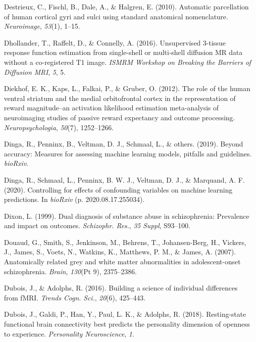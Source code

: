 \documentclass[11pt,american,a4paper,oneside,]{memoir} %
\begin{document}
\leavevmode\hypertarget{ref-Destrieux2010-rd}{}%
Destrieux, C., Fischl, B., Dale, A., \& Halgren, E. (2010). Automatic parcellation of human cortical gyri and sulci using standard anatomical nomenclature. \emph{Neuroimage}, \emph{53}(1), 1--15.

\leavevmode\hypertarget{ref-Dhollander2016-dx}{}%
Dhollander, T., Raffelt, D., \& Connelly, A. (2016). Unsupervised 3-tissue response function estimation from single-shell or multi-shell diffusion MR data without a co-registered T1 image. \emph{ISMRM Workshop on Breaking the Barriers of Diffusion MRI}, \emph{5}, 5.

\leavevmode\hypertarget{ref-diekhof2012role}{}%
Diekhof, E. K., Kaps, L., Falkai, P., \& Gruber, O. (2012). The role of the human ventral striatum and the medial orbitofrontal cortex in the representation of reward magnitude--an activation likelihood estimation meta-analysis of neuroimaging studies of passive reward expectancy and outcome processing. \emph{Neuropsychologia}, \emph{50}(7), 1252--1266.

\leavevmode\hypertarget{ref-Dinga2019-mh}{}%
Dinga, R., Penninx, B., Veltman, D. J., Schmaal, L., \& others. (2019). Beyond accuracy: Measures for assessing machine learning models, pitfalls and guidelines. \emph{bioRxiv}.

\leavevmode\hypertarget{ref-Dinga2020-si}{}%
Dinga, R., Schmaal, L., Penninx, B. W. J., Veltman, D. J., \& Marquand, A. F. (2020). Controlling for effects of confounding variables on machine learning predictions. In \emph{bioRxiv} (p. 2020.08.17.255034).

\leavevmode\hypertarget{ref-Dixon1999-kl}{}%
Dixon, L. (1999). Dual diagnosis of substance abuse in schizophrenia: Prevalence and impact on outcomes. \emph{Schizophr. Res.}, \emph{35 Suppl}, S93--100.

\leavevmode\hypertarget{ref-Douaud2007-sw}{}%
Douaud, G., Smith, S., Jenkinson, M., Behrens, T., Johansen-Berg, H., Vickers, J., James, S., Voets, N., Watkins, K., Matthews, P. M., \& James, A. (2007). Anatomically related grey and white matter abnormalities in adolescent-onset schizophrenia. \emph{Brain}, \emph{130}(Pt 9), 2375--2386.

\leavevmode\hypertarget{ref-Dubois2016-zz}{}%
Dubois, J., \& Adolphs, R. (2016). Building a science of individual differences from fMRI. \emph{Trends Cogn. Sci.}, \emph{20}(6), 425--443.

\leavevmode\hypertarget{ref-dubois2018resting}{}%
Dubois, J., Galdi, P., Han, Y., Paul, L. K., \& Adolphs, R. (2018). Resting-state functional brain connectivity best predicts the personality dimension of openness to experience. \emph{Personality Neuroscience}, \emph{1}.
\end{document}

